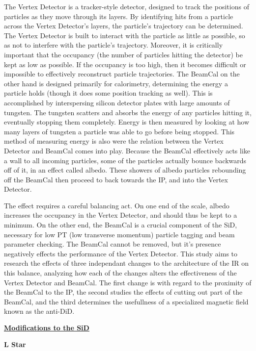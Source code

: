 \documentclass{article}
\begin{document}
        The Vertex Detector is a tracker-style detector, designed to track the positions of particles as they move through its layers. By identifying hits from a particle across the Vertex Detector's layers, the particle's trajectory can be determined. The Vertex Detector is built to interact with the particle as little as possible, so as not to interfere with the particle's trajectory. Moreover, it is critically important that the occupancy (the number of particles hitting the detector) be kept as low as possible. If the occupancy is too high, then it becomes difficult or impossible to effectively reconstruct particle trajectories. The BeamCal on the other hand is designed primarily for calorimetry, determining the energy a particle holds (though it does some position tracking as well). This is accomplished by interspersing silicon detector plates with large amounts of tungsten. The tungsten scatters and absorbs the energy of any particles hitting it, eventually stopping them completely. Energy is then measured by looking at how many layers of tungsten a particle was able to go before being stopped. This method of measuring energy is also were the relation between the Vertex Detector and BeamCal comes into play. Because the BeamCal effectively acts like a wall to all incoming particles, some of the particles actually bounce backwards off of it, in an effect called albedo. These showers of albedo particles rebounding off the BeamCal then proceed to back towards the IP, and into the Vertex Detector.
        
        The effect requires a careful balancing act. On one end of the scale, albedo increases the occupancy in the Vertex Detector, and should thus be kept to a minimum. On the other end, the BeamCal is a crucial component of the SiD, necessary for low PT (low transverse momentum) particle tagging and beam parameter checking. The BeamCal cannot be removed, but it's presence negatively effects the performance of the Vertex Detector. This study aims to research the effects of three independant changes to the architecture of the IR on this balance, analyzing how each of the changes alters the effectiveness of the Vertex Detector and BeamCal. The first change is with regard to the proximity of the BeamCal to the IP, the second studies the effects of cutting out part of the BeamCal, and the third determines the usefullness of a specialized magnetic field known as the anti-DiD.


    \vspace{10mm}
    \begin{center}
        \underline{\bf{\large Modifications to the SiD}}
    \end{center}
        \begin{center}
            \bf{L Star}
        \end{center}
\end{document}

